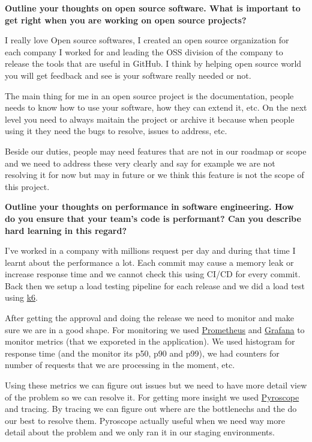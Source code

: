 \noindent
\textbf{Outline your thoughts on open source software. What is important to get right when you are working on open source projects?}

I really love Open source softwares, I created an open source organization for each company I worked for and leading
the OSS division of the company to release the tools that are useful in GitHub. I think by helping open source world
you will get feedback and see is your software really needed or not.

The main thing for me in an open source project is the documentation, people needs to know how to use your software,
how they can extend it, etc. On the next level you need to always maitain the project or archive it because
when people using it they need the bugs to resolve, issues to address, etc.

Beside our duties, people may need features that are not in our roadmap or scope and we need to address these very
clearly and say for example we are not resolving it for now but may in future or we think this feature is not the
scope of this project.

\noindent
\textbf{Outline your thoughts on performance in software engineering. How do you ensure that your team's code is performant?
Can you describe hard learning in this regard?}

I've worked in a company with millions request per day and during that time I learnt about the performance a lot.
Each commit may cause a memory leak or increase response time and we cannot check this using CI/CD for every commit.
Back then we setup a load testing pipeline for each release and we did a load test using \href{https://github.com/grafana/k6}{k6}.

After getting the approval and doing the release we need to monitor and make sure we are in a good shape.
For monitoring we used \href{https://prometheus.io/}{Prometheus} and \href{https://grafana.com/}{Grafana} to monitor
metrics (that we exporeted in the application). We used histogram for response time (and the monitor its p50, p90 and p99),
we had counters for number of requests that we are processing in the moment, etc.

Using these metrics we can figure out issues but we need to have more detail view of the problem so we can resolve it.
For getting more insight we used \href{https://pyroscope.io/}{Pyroscope} and tracing. By tracing we can figure out where are the bottlenechs
and the do our best to resolve them. Pyroscope actually useful when we need way more detail about the problem
and we only ran it in our staging environments.

